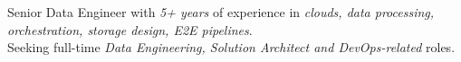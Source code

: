 
Senior Data Engineer with \textit{5+ years} of experience in
\textit{clouds, data processing, orchestration, storage design, E2E pipelines}.\\
Seeking full-time \textit{Data Engineering, Solution Architect and DevOps-related} roles.